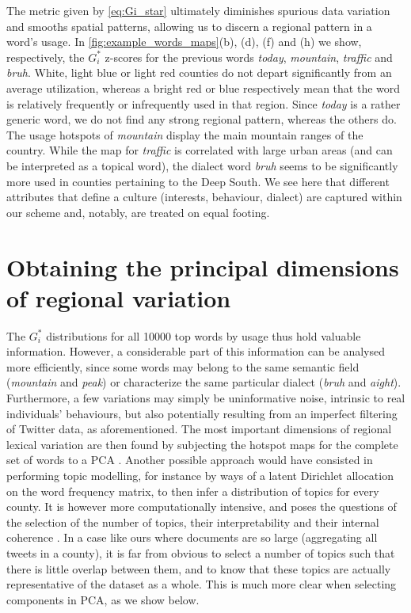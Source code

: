 \documentclass[../thesis.tex]{subfiles}
\begin{document}
The metric given by \cref{eq:Gi_star} ultimately diminishes spurious data variation and
smooths spatial patterns, allowing us to discern a regional pattern in a word's usage.
In \cref{fig:example_words_maps}(b), (d), (f) and (h) we show, respectively, the $G_i^*$
z-scores for the previous words \textit{today}, \textit{mountain}, \textit{traffic} and
\textit{bruh}. White, light blue or light red counties do not depart significantly from
an average utilization, whereas a bright red or blue respectively mean that the word is
relatively frequently or infrequently used in that region. Since \textit{today} is a
rather generic word, we do not find any strong regional pattern, whereas the others do.
The usage hotspots of \textit{mountain} display the main mountain ranges of the country.
While the map for \textit{traffic} is correlated with large urban areas (and can be
interpreted as a topical word), the dialect word \textit{bruh} seems to be significantly
more used in counties pertaining to the Deep South. We see here that different
attributes that define a culture (interests, behaviour, dialect) are captured within our
scheme and, notably, are treated on equal footing.


\section{Obtaining the principal dimensions of regional variation}
The $G_i^*$ distributions for all \SI{10000}{} top words by usage thus hold valuable
information. However, a considerable part of this information can be analysed more
efficiently, since some words may belong to the same semantic field (\textit{mountain}
and \textit{peak}) or characterize the same particular dialect (\textit{bruh} and
\textit{aight}). Furthermore, a few variations may simply be uninformative noise,
intrinsic to real individuals' behaviours, but also potentially resulting from an
imperfect filtering of Twitter data, as aforementioned. The most important dimensions of
regional lexical variation are then found by subjecting the hotspot maps for the
complete set of words to a \ac{PCA}
\cite{LieskeRegionalSubcultures1993,WoldPrincipalComponent1987}. Another possible
approach would have consisted in performing topic modelling, for instance by ways of a
latent Dirichlet allocation on the word frequency matrix, to then infer a distribution
of topics for every county. It is however more computationally intensive, and poses the
questions of the selection of the number of topics, their interpretability and their
internal coherence \cite{ArunFindingNatural2010,HasanNormalizedApproach2021}. In a case
like ours where documents are so large (aggregating all tweets in a county), it is far
from obvious to select a number of topics such that there is little overlap between
them, and to know that these topics are actually representative of the dataset as a
whole. This is much more clear when selecting components in \ac{PCA}, as we show
below.
\end{document}
